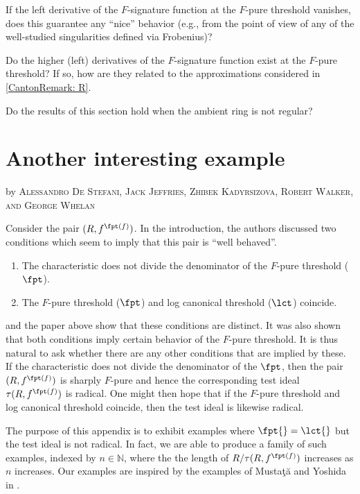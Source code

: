 \documentclass[11pt]{amsart}
\begin{document}
\begin{question}
If the left derivative of the $F$-signature function at the $F$-pure threshold vanishes, does this guarantee any ``nice'' behavior (e.g., from the point of view of any of the well-studied singularities defined via Frobenius)?
\end{question}

\begin{question}
Do the higher (left) derivatives of the $F$-signature function exist at the $F$-pure threshold?  If so, how are they related to the approximations considered in \autoref{CantonRemark: R}.
\end{question}

\begin{question}
Do the results of this section hold when the ambient ring is not regular?
\end{question}

\appendix\section{Another interesting example}
\begin{center}
{by \textsc{Alessandro De Stefani, Jack Jeffries, Zhibek Kadyrsizova, Robert Walker, and George Whelan} }
\end{center}
\vskip 6pt
Consider the pair $(R, f^{\fpt(f)})$.  In the introduction, the authors discussed two conditions which seem to imply that this pair is ``well behaved''.
\begin{enumerate}
\item{}  The characteristic does not divide the denominator of the $F$-pure threshold ($\fpt$).
\item{}  The $F$-pure threshold ($\fpt$) and log canonical threshold ($\lct$) coincide.
\end{enumerate}
\cite[Example 4.5]{MustataTakagiWatanabeFThresholdsAndBernsteinSato} and the paper above show that these conditions are distinct.
It was also shown that both conditions imply certain behavior of the $F$-pure threshold.  It is thus natural to ask whether there are any other conditions that are implied by these.  If the characteristic does not divide the denominator of the $\fpt$, then the pair $(R, f^{\fpt(f)})$ is sharply $F$-pure and hence the corresponding test ideal $\tau(R, f^{\fpt(f)})$ is radical.  One might then hope that if the $F$-pure threshold and log canonical threshold coincide, then the test ideal is likewise radical.

The purpose of this appendix is to exhibit examples where $\fpt{} = \lct{}$ but the test ideal is not radical. In fact, we are able to produce a family of such examples, indexed by $n \in {\mathbb{N}}$, where the the length of $R/\tau(R, f^{\fpt(f)})$ increases as $n$ increases. Our examples are inspired by the examples of Musta\c{t}\u{a} and Yoshida in \cite{MustataYoshidaTestIdealVsMultiplierIdeals}.
\end{document}

